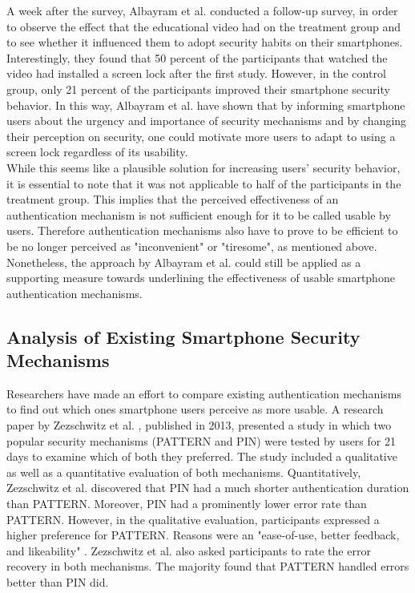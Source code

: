 A week after the survey, Albayram et al. \cite{Albayram:2017:BUL:3235924.3235929} conducted a follow-up survey, in order to observe the effect that the educational video had on the treatment group and to see whether it influenced them to adopt security habits on their smartphones. Interestingly, they found that 50 percent of the participants that watched the video had installed a screen lock after the first study. However, in the control group, only 21 percent of the participants improved their smartphone security behavior. In this way, Albayram et al. \cite{Albayram:2017:BUL:3235924.3235929} have shown that by informing smartphone users about the urgency and importance of security mechanisms and by changing their perception on security, one could motivate more users to adapt to using a screen lock regardless of its usability. \\

While this seems like a plausible solution for increasing users' security behavior, it is essential to note that it was not applicable to half of the participants in the treatment group. This implies that the perceived effectiveness of an authentication mechanism is not sufficient enough for it to be called usable by users. Therefore authentication mechanisms also have to prove to be efficient to be no longer perceived as "inconvenient" or "tiresome", as mentioned above. Nonetheless, the approach by Albayram et al. \cite{Albayram:2017:BUL:3235924.3235929} could still be applied as a supporting measure towards underlining the effectiveness of usable smartphone authentication mechanisms. 

\subsection{Analysis of Existing Smartphone Security Mechanisms} \label{2.2.2}

Researchers have made an effort to compare existing authentication mechanisms to find out which ones smartphone users perceive as more usable. A research paper by Zezschwitz et al. \cite{PatternWild}, published in 2013, presented a study in which two popular security mechanisms (PATTERN and PIN) were tested by users for 21 days to examine which of both they preferred. The study included a qualitative as well as a quantitative evaluation of both mechanisms. Quantitatively, Zezschwitz et al. \cite{PatternWild} discovered that PIN had a much shorter authentication duration than PATTERN. Moreover, PIN had a prominently lower error rate than PATTERN. However, in the qualitative evaluation, participants expressed a higher preference for PATTERN. Reasons were an "ease-of-use, better feedback, and likeability" \cite{PatternWild}. Zezschwitz et al. \cite{PatternWild} also asked participants to rate the error recovery in both mechanisms. The majority found that PATTERN handled errors better than PIN did.\\

